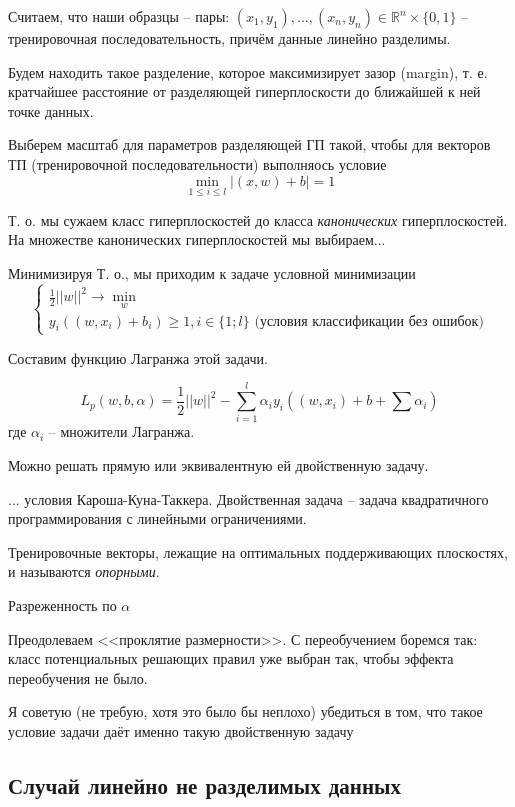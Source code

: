 \documentclass[main.tex]{subfiles}
\begin{document}
Считаем, что наши образцы -- пары:
 $ (x_1, y_1), \dots, (x_n, y_n) \in \mathds R^n \times \{ 0, 1 \} $ -- тренировочная последовательность, причём данные линейно разделимы.
 
 Будем находить такое разделение, которое максимизирует зазор (margin), т. е. кратчайшее расстояние от разделяющей гиперплоскости до ближайшей к ней точке данных.
 
 Выберем масштаб для параметров разделяющей ГП такой, чтобы для векторов ТП (тренировочной последовательности) выполняось условие
 \[ \min_{1 \le i \le l} | (x, w) + b | = 1 \]
 
 Т. о. мы сужаем класс гиперплоскостей до класса \emph{канонических} гиперплоскостей.
 На множестве канонических гиперплоскостей мы выбираем... %
 
 Минимизируя 
 Т. о., мы приходим к задаче условной минимизации
 \[ \begin{cases}
 	\frac{1}{2} || w ||^2 \to \min_w \\
 	y_i \left( (w,x_i) + b_i \right) \ge 1, i \in \{ 1; l \} \text{ (условия классификации без ошибок)}
 \end{cases} \]

Составим функцию Лагранжа этой задачи.

\[ L_p (w, b, \alpha) = \frac{1}{2} || w ||^2 - \sum_{i=1}^{l} \alpha_i y_i \left( (w, x_i) + b + \sum \alpha_i \right) \]
где $ \alpha_i $ -- множители Лагранжа.

Можно решать прямую или эквивалентную ей двойственную задачу.

... условия Кароша-Куна-Таккера.
Двойственная задача -- задача квадратичного программирования с линейными ограничениями.

Тренировочные векторы, лежащие на оптимальных поддерживающих плоскостях, и называются \emph{опорными}.

Разреженность по $ \alpha $ 

Преодолеваем <<проклятие размерности>>.
С переобучением боремся так: класс потенциальных решающих правил уже выбран так, чтобы эффекта переобучения не было.

\begin{leftbar}
	Я советую (не требую, хотя это было бы неплохо) убедиться в том, что такое условие задачи даёт именно такую двойственную задачу
\end{leftbar}

\subsection{Случай линейно не разделимых данных}
\end{document}
